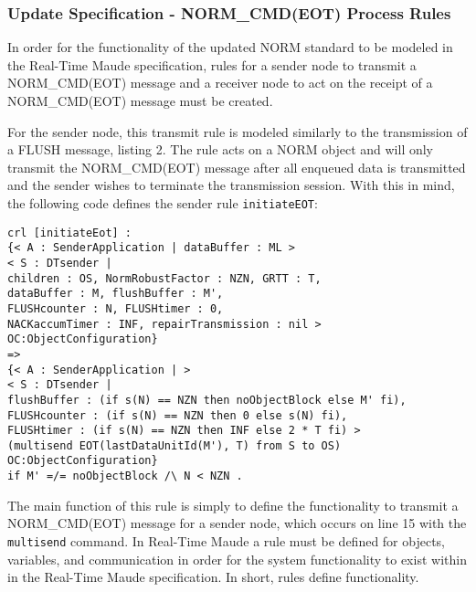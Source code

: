 \documentclass[10pt, journal]{IEEEtran}
\begin{document}
\subsubsection{Update Specification - NORM\_CMD(EOT) Process Rules}
In order for the functionality of the updated NORM standard to be modeled in the Real-Time Maude specification, rules for a sender node to transmit a NORM\_CMD(EOT) message and a receiver node to act on the receipt of a NORM\_CMD(EOT) message must be created.

For the sender node, this transmit rule is modeled similarly to the transmission of a FLUSH message, listing 2. The rule acts on a NORM object and will only transmit the NORM\_CMD(EOT) message after all enqueued data is transmitted and the sender wishes to terminate the transmission session. With this in mind, the following code defines the sender rule \texttt{initiateEOT}:
\bigbreak
\begin{lstlisting}[caption=Rule defining Sender initiating EOT, label=lst8:mxm,]
crl [initiateEot] :
{< A : SenderApplication | dataBuffer : ML >
< S : DTsender |
children : OS, NormRobustFactor : NZN, GRTT : T,
dataBuffer : M, flushBuffer : M',
FLUSHcounter : N, FLUSHtimer : 0,
NACKaccumTimer : INF, repairTransmission : nil >
OC:ObjectConfiguration}
=>
{< A : SenderApplication | >
< S : DTsender |
flushBuffer : (if s(N) == NZN then noObjectBlock else M' fi),
FLUSHcounter : (if s(N) == NZN then 0 else s(N) fi), 
FLUSHtimer : (if s(N) == NZN then INF else 2 * T fi) >
(multisend EOT(lastDataUnitId(M'), T) from S to OS)
OC:ObjectConfiguration}
if M' =/= noObjectBlock /\ N < NZN .
\end{lstlisting}

The main function of this rule is simply to define the functionality to transmit a NORM\_CMD(EOT) message for a sender node, which occurs on line 15 with the \texttt{multisend} command. In Real-Time Maude a rule must be defined for objects, variables, and communication in order for the system functionality to exist within in the Real-Time Maude specification. In short, rules define functionality.
\end{document}
